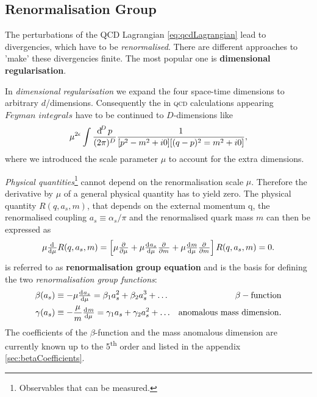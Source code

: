 \documentclass[../../index.tex]{subfiles}
\begin{document}
\subsection{Renormalisation Group}
The perturbations of the QCD Lagrangian \ref{eq:qcdLagrangian} lead to
divergencies, which have to be \textit{renormalised}. There are different
approaches to 'make' these divergencies finite. The most popular one is
\textbf{dimensional regularisation}.

In \textit{dimensional regularisation} we expand the four space-time dimensions
to arbitrary $d$\-/dimensions. Consequently the in \textsc{qcd} calculations
appearing $\textit{Feyman integrals}$ have to be continued to $D$-dimensions
like
\begin{equation}
  \label{eq:dimRegFeynmanIntegral}
  \mu^{2\epsilon} \int \frac{\dif^D p}{(2\pi)^D}\frac{1}{[p^2-m^2+i0][(q-p)^2=m^2+i0]},
\end{equation}
where we introduced the scale parameter $\mu$ to account for the extra
dimensions.

\textit{Physical quantities}\footnote{Observables that can be measured.} cannot
depend on the renormalisation scale $\mu$. Therefore the derivative by $\mu$ of
a general physical quantity has to yield zero. The physical quantity $R(q, a_s,
m)$, that depends on the external momentum q, the renormalised coupling
$a_s\equiv\alpha_s/\pi$ and the renormalised quark mass $m$ can then be
expressed as
\begin{equation}
  \label{eq:RGE}
  \mu \od{}{\mu}R(q, a_s, m) = \left[ \mu \pd{}{\mu} + \mu \od{a_s}{\mu} \pd{}{m} + \mu \od{m}{\mu} \pd{}{m} \right] R(q, a_s, m) = 0.
\end{equation}
 is referred to as \textbf{renormalisation group equation} and is
the basis for defining the two \textit{renormalisation group functions}:
\begin{align}
  \beta(a_s) &\equiv -\mu \od{a_s}{\mu} = \beta_1 a_s^2 + \beta_2 a_s^3 + \dots & \beta-\text{function}
                                                                                  \label{eq:betaFunction} \\
  \gamma(a_s) &\equiv - \frac{\mu}{m} \od{m}{\mu} = \gamma_1 a_s + \gamma_2 a_s^2 + \dots & \text{anomalous mass dimension}.
                                                                                            \label{eq:anomalousMassDimension}
\end{align}
The coefficients of the $\beta$-function and the mass anomalous dimension are currently known up to the 5\textsuperscript{th} order
and listed in the appendix \ref{sec:betaCoefficients}.
\end{document}
